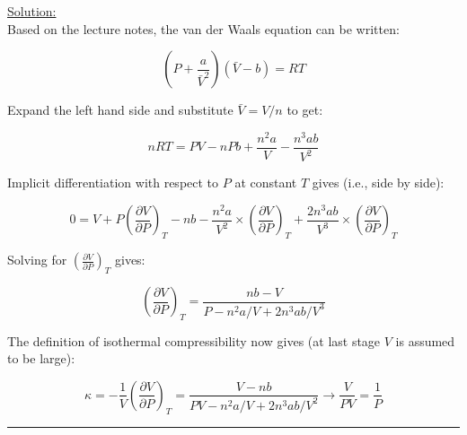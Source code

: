 \noindent
\underline{Solution:}\\

Based on the lecture notes, the van der Waals equation can be written:

$$\left(P + \frac{a}{\bar{V}^2}\right)\left(\bar{V} - b\right) = RT$$

Expand the left hand side and substitute $\bar{V} = V/n$ to get:

$$nRT = PV - nPb + \frac{n^2a}{V} - \frac{n^3ab}{V^2}$$

Implicit differentiation with respect to $P$ at constant $T$ gives (i.e., side by side):

$$0 = V + P\left(\frac{\partial V}{\partial P}\right)_T - nb - \frac{n^2a}{V^2}\times\left(\frac{\partial V}{\partial P}\right)_T + \frac{2n^3ab}{V^3}\times\left(\frac{\partial V}{\partial P}\right)_T$$

Solving for $\left(\frac{\partial V}{\partial P}\right)_T$ gives:

$$\left(\frac{\partial V}{\partial P}\right)_T = \frac{nb - V}{P - n^2a/V + 2n^3ab/V^3}$$

The definition of isothermal compressibility now gives (at last stage $V$ is assumed to be large):

$$\kappa = -\frac{1}{V}\left(\frac{\partial V}{\partial P}\right)_T = \frac{V - nb}{PV - n^2a/V + 2n^3ab/V^2} \rightarrow \frac{V}{PV} = \frac{1}{P}$$

\hrule\vspace{0.5cm}
